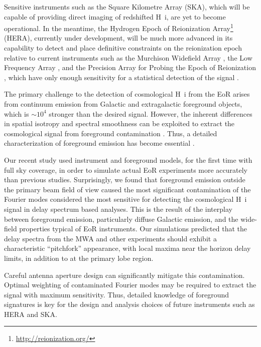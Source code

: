 \documentclass[preprint2,apjl,numberedappendix,twocolappendix,appendixfloats]{emulateapj}
\begin{document}
Sensitive instruments such as the Square Kilometre Array (SKA), which will be capable of providing direct imaging of redshifted H~{\sc i}, are yet to become operational. In the meantime, the Hydrogen Epoch of Reionization Array\footnote{\url{http://reionization.org/}} (HERA), currently under development, will be much more advanced in its capability to detect and place definitive constraints on the reionization epoch relative to current instruments such as the Murchison Widefield Array \citep[MWA;][]{lon09,bow13,tin13}, the Low Frequency Array \citep[LOFAR;][]{van13}, and the Precision Array for Probing the Epoch of Reionization \citep[PAPER;][]{par10}, which have only enough sensitivity for a statistical detection of the signal \citep{bow06,par12a,bea13,dil13,thy13,pob14}.

The primary challenge to the detection of cosmological H~{\sc i} from the EoR arises from continuum emission from Galactic and extragalactic foreground objects, which is $\sim 10^4$ stronger than the desired signal. However, the inherent differences in spatial isotropy and spectral smoothness can be exploited to extract the cosmological signal from foreground contamination \citep[see, e.g.,][]{dim02,dim04,fur04,mor04,zal04,san05,fur06,mcq06,mor06,wan06,gle08}. Thus, a detailed characterization of foreground emission has become essential \citep{ali08,ber09,ber10,bow09,liu09,liu14a,liu14b,dat10,liu11,gho12,mor12,par12b,tro12,dil13,dil14,pob13,thy13,thy15}.

Our recent study \citep[][hereafter referred to as Paper~I]{thy15} used instrument and foreground models, for the first time with full sky coverage, in order to simulate actual EoR experiments more accurately than previous studies. Surprisingly, we found that foreground emission outside the primary beam field of view caused the most significant contamination of the Fourier modes considered the most sensitive for detecting the cosmological H~{\sc i} signal in delay spectrum based analyses. This is the result of the interplay between foreground emission, particularly diffuse Galactic emission, and the wide-field properties typical of EoR instruments. Our simulations predicted that the delay spectra from the MWA and other experiments should exhibit a characteristic ``pitchfork'' appearance, with local maxima near the horizon delay limits, in addition to at the primary lobe region.  

Careful antenna aperture design can significantly mitigate this contamination. Optimal weighting of contaminated Fourier modes may be required to extract the signal with maximum sensitivity. Thus, detailed knowledge of foreground signatures is key for the design and analysis choices of future instruments such as HERA and SKA.
\end{document}
